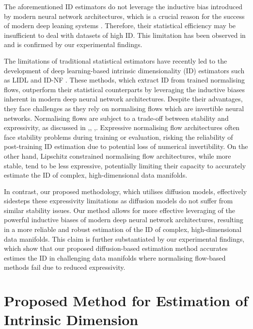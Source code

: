 The aforementioned ID estimators do not leverage the inductive bias introduced by modern neural network architectures, which is a crucial reason for the success of modern deep leaning systems \cite{goyal2022inductive}. Therefore, their statistical efficiency may be insufficient to deal with datasets of high ID. This limitation has been observed in  \cite{campadelli2015intrinsic, horvat2022nfid} and is confirmed by our experimental findings.


The limitations of traditional statistical estimators have recently led to the development of deep learning-based intrinsic dimensionality (ID) estimators such as LIDL \cite{tempczyk2022lidl} and ID-NF \cite{horvat2022nfid}. These methods, which extract ID from trained normalising flows, outperform their statistical counterparts by leveraging the inductive biases inherent in modern deep neural network architectures. Despite their advantages, they face challenges as they rely on normalising flows which are invertible neural networks. Normalising flows are subject to a trade-off between stability and expressivity, as discussed in \cite{behrmann2021understandin},\cite{jaini2020tails}, \cite{cornish2020relaxing},\cite{laszkiewicz2021copula}. Expressive normalising flow architectures often face stability problems during training or evaluation, risking the reliability of post-training ID estimation due to potential loss of numerical invertibility. On the other hand, Lipschitz constrained normalising flow architectures, while more stable, tend to be less expressive, potentially limiting their capacity to accurately estimate the ID of complex, high-dimensional data manifolds.

In contrast, our proposed methodology, which utilises diffusion models, effectively sidesteps these expressivity limitations as diffusion models do not suffer from similar stability issues. Our method allows for more effective leveraging of the powerful inductive biases of modern deep neural network architectures, resulting in a more reliable and robust estimation of the ID of complex, high-dimensional data manifolds. This claim is further substantiated by our experimental findings, which show that our proposed diffusion-based estimation method accurates estimes the ID in challenging data manifolds where normalising flow-based methods fail due to reduced expressivity.

\section{Proposed Method for Estimation of Intrinsic Dimension}
\label{ch3:sec:method}


